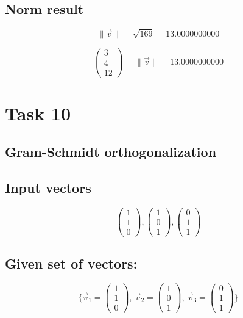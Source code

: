\documentclass{article}
\begin{document}
\subsection*{ \vspace{1em} Norm result}
\[
\|\vec{v}\| = \sqrt{169} = 13.0000000000
\]
\medskip

\[
\begin{pmatrix}3 \\ 4 \\ 12\end{pmatrix} = \|\vec{v}\| = 13.0000000000
\]
\bigskip

\hrulefill
\bigskip

\section*{Task 10}

\subsection*{Gram-Schmidt orthogonalization}
\subsection*{ \vspace{1em} Input vectors}
\[
\begin{pmatrix}1 \\ 1 \\ 0\end{pmatrix}, \begin{pmatrix}1 \\ 0 \\ 1\end{pmatrix}, \begin{pmatrix}0 \\ 1 \\ 1\end{pmatrix}
\]
\subsection*{ \vspace{1em} Given set of vectors:}
\[
\{ \vec{v}_{1} = \begin{pmatrix}1 \\ 1 \\ 0\end{pmatrix},\ \vec{v}_{2} = \begin{pmatrix}1 \\ 0 \\ 1\end{pmatrix},\ \vec{v}_{3} = \begin{pmatrix}0 \\ 1 \\ 1\end{pmatrix} \}
\]
\end{document}
